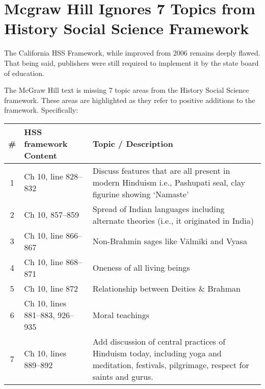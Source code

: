 \chapter{Mcgraw Hill Ignores 7 Topics from History Social Science Framework}

The California HSS Framework, while improved from 2006 remains deeply flawed. That being said, publishers were still required to implement it by the state board of education.

The McGraw Hill text is missing 7 topic areas from the History Social Science framework. These areas are highlighted as they refer to positive additions to the framework. Specifically:

\begin{longtable}{|c|p{3.5cm}|p{5.5cm}|}
\hline 
\# & HSS framework Content & Topic / Description\tabularnewline
\hline
1 & Ch 10, line 828--832 &  Discuss features that are all present in modern Hinduism i.e., Pashupati seal, clay figurine showing ‘Namaste’\tabularnewline
\hline
2 & Ch 10, 857--859 & Spread of Indian languages including alternate theories (i.e., it originated in India)\tabularnewline 
\hline
3 & Ch 10, line 866--867 & Non-Brahmin sages like Vālmīki and Vyasa\tabularnewline
\hline
4 & Ch 10, line 868--871 & Oneness of all living beings\tabularnewline
\hline
5 & Ch 10, line 872 & Relationship between Deities \& Brahman\tabularnewline
\hline
6 & Ch 10, lines 881--883, 926--935 & Moral teachings\tabularnewline
\hline
7 & Ch 10, lines 889--892 & Add discussion of central practices of Hinduism today, including yoga and meditation, festivals, pilgrimage, respect for saints 
and gurus.\tabularnewline
\hline
\end{longtable}

